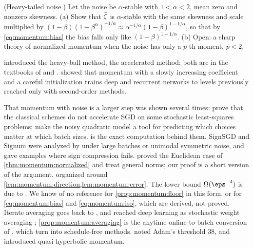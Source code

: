 \begin{refsection}
\begin{exercises}
\item \research (Heavy-tailed noise.) Let the noise be $\alpha$-stable with $1<\alpha<2$, mean zero and nonzero skewness. (a) Show that $\bar\zeta$ is $\alpha$-stable with the same skewness and scale multiplied by $(1-\beta)(1-\beta^\alpha)^{-1/\alpha}\approx\alpha^{-1/\alpha}(1-\beta)^{1-1/\alpha}$, so that by \eqref{eq:momentum:bias} the bias falls only like $(1-\beta)^{1-1/\alpha}$. (b) Open: a sharp theory of normalized momentum when the noise has only a $p$-th moment, $p<2$.\label{ex:momentum:heavytail}
\end{exercises}

\notesandrefs
\Textcite{Polyak1964} introduced the heavy-ball method, \textcite{Nesterov1983} the accelerated method; both are in the textbooks of \textcite{Polyak1987} and \textcite{Nesterov2018}. \Textcite{SutskeverEtAl2013} showed that momentum with a slowly increasing coefficient and a careful initialization trains deep and recurrent networks to levels previously reached only with second-order methods.

That momentum with noise is a larger step was shown several times: \textcite{KidambiEtAl2018} prove that the classical schemes do not accelerate SGD on some stochastic least-squares problems; \textcite{ZhangEtAl2019} make the noisy quadratic model a tool for predicting which choices matter at which batch sizes.  is the exact computation behind them. SignSGD and Signum were analyzed by \textcite{BernsteinEtAl2018} under large batches or unimodal symmetric noise, and \textcite{KarimireddyEtAl2019} gave examples where sign compression fails. \Textcite{CutkoskyMehta2020} proved the Euclidean case of \cref{thm:momentum:normalized} and \textcite{PethickEtAl2025} treat general norms; our proof is a short version of the argument, organized around \cref{lem:momentum:direction,lem:momentum:error}. The lower bound $\Omega(\eps^{-4})$ is due to \textcite{ArjevaniEtAl2023}. We know of no reference for \cref{prop:momentum:floor} in this form, or for \eqref{eq:momentum:bias} and \eqref{eq:momentum:iso}, which are derived, not proved. Iterate averaging goes back to \textcite{PolyakJuditsky1992}, and reached deep learning as stochastic weight averaging \parencite{IzmailovEtAl2018}; \cref{prop:momentum:averaging} is the anytime online-to-batch conversion of \textcite{Cutkosky2019}, which \textcite{DefazioEtAl2024} turn into schedule-free methods. \Textcite{CohenEtAl2022} noted Adam's threshold $38$, and \textcite{MaYarats2019} introduced quasi-hyperbolic momentum.


\end{refsection}
